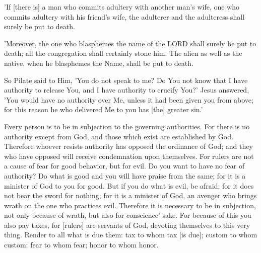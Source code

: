 \vspace{2\baselineskip}

\begin{scripture}[Leviticus 20:10]
    'If [there is] a man who commits adultery with another man's wife, one who commits adultery with his friend's wife, the adulterer and the adulteress shall surely be put to death.
\end{scripture}

\vspace{2\baselineskip}

\begin{scripture}[Leviticus 24:16]
    'Moreover, the one who blasphemes the name of the LORD shall surely be put to death; all the congregation shall certainly stone him. The alien as well as the native, when he blasphemes the Name, shall be put to death.
\end{scripture}

\vspace{2\baselineskip}

\begin{scripture}[John 19:10-11]
    So Pilate said to Him, 'You do not speak to me? Do You not know that I have authority to release You, and I have authority to crucify You?'
    Jesus answered, 'You would have no authority over Me, unless it had been given you from above; for this reason he who delivered Me to you has [the] greater sin.'
\end{scripture}

\vspace{2\baselineskip}

\begin{scripture}[Romans 13:1-7]
    Every person is to be in subjection to the governing authorities. For there is no authority except from God, and those which exist are established by God.
    Therefore whoever resists authority has opposed the ordinance of God; and they who have opposed will receive condemnation upon themselves.
    For rulers are not a cause of fear for good behavior, but for evil. Do you want to have no fear of authority? Do what is good and you will have praise from the same;
    for it is a minister of God to you for good. But if you do what is evil, be afraid; for it does not bear the sword for nothing; for it is a minister of God, an avenger who brings wrath on the one who practices evil.
    Therefore it is necessary to be in subjection, not only because of wrath, but also for conscience' sake.
    For because of this you also pay taxes, for [rulers] are servants of God, devoting themselves to this very thing.
    Render to all what is due them: tax to whom tax [is due]; custom to whom custom; fear to whom fear; honor to whom honor.
\end{scripture}


\vspace{6\baselineskip}
